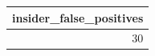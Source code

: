 \begin{tabular}{r}
  \hline
 insider\_false\_positives \\ 
  \hline
  30 \\ 
   \hline
\end{tabular}